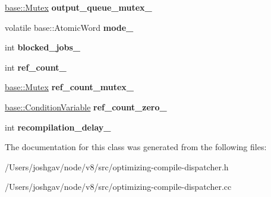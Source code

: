 \begin{DoxyCompactItemize}
\item 
\hyperlink{classv8_1_1base_1_1_mutex}{base\+::\+Mutex} {\bfseries output\+\_\+queue\+\_\+mutex\+\_\+}\hypertarget{classv8_1_1internal_1_1_optimizing_compile_dispatcher_a512e756d42a262c9a18e9143815b6917}{}\label{classv8_1_1internal_1_1_optimizing_compile_dispatcher_a512e756d42a262c9a18e9143815b6917}

\item 
volatile base\+::\+Atomic\+Word {\bfseries mode\+\_\+}\hypertarget{classv8_1_1internal_1_1_optimizing_compile_dispatcher_a658875fb2d0155c00327cdb156435164}{}\label{classv8_1_1internal_1_1_optimizing_compile_dispatcher_a658875fb2d0155c00327cdb156435164}

\item 
int {\bfseries blocked\+\_\+jobs\+\_\+}\hypertarget{classv8_1_1internal_1_1_optimizing_compile_dispatcher_aed50486b1b18ed95b1c1c2edd932324c}{}\label{classv8_1_1internal_1_1_optimizing_compile_dispatcher_aed50486b1b18ed95b1c1c2edd932324c}

\item 
int {\bfseries ref\+\_\+count\+\_\+}\hypertarget{classv8_1_1internal_1_1_optimizing_compile_dispatcher_a5ce043500a4ea64e0472d06231401e0e}{}\label{classv8_1_1internal_1_1_optimizing_compile_dispatcher_a5ce043500a4ea64e0472d06231401e0e}

\item 
\hyperlink{classv8_1_1base_1_1_mutex}{base\+::\+Mutex} {\bfseries ref\+\_\+count\+\_\+mutex\+\_\+}\hypertarget{classv8_1_1internal_1_1_optimizing_compile_dispatcher_a76e57976b8a74424e061699bc3d19f25}{}\label{classv8_1_1internal_1_1_optimizing_compile_dispatcher_a76e57976b8a74424e061699bc3d19f25}

\item 
\hyperlink{classv8_1_1base_1_1_condition_variable}{base\+::\+Condition\+Variable} {\bfseries ref\+\_\+count\+\_\+zero\+\_\+}\hypertarget{classv8_1_1internal_1_1_optimizing_compile_dispatcher_a5cb4c5358c49fb18f9e4314406392067}{}\label{classv8_1_1internal_1_1_optimizing_compile_dispatcher_a5cb4c5358c49fb18f9e4314406392067}

\item 
int {\bfseries recompilation\+\_\+delay\+\_\+}\hypertarget{classv8_1_1internal_1_1_optimizing_compile_dispatcher_a3186513b543f53ca9d43490c669e6a09}{}\label{classv8_1_1internal_1_1_optimizing_compile_dispatcher_a3186513b543f53ca9d43490c669e6a09}

\end{DoxyCompactItemize}


The documentation for this class was generated from the following files\+:\begin{DoxyCompactItemize}
\item 
/\+Users/joshgav/node/v8/src/optimizing-\/compile-\/dispatcher.\+h\item 
/\+Users/joshgav/node/v8/src/optimizing-\/compile-\/dispatcher.\+cc\end{DoxyCompactItemize}
